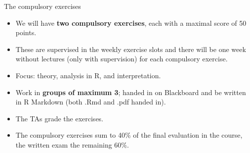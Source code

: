 \documentclass[10pt,ignorenonframetext,]{beamer}
\providecommand{\tightlist}{%
  \setlength{\itemsep}{0pt}\setlength{\parskip}{0pt}}
\begin{document}
\begin{frame}

\begin{block}{The compulsory exercises}

\vspace{2mm}

\begin{itemize}
\tightlist
\item
  We will have \textbf{two compulsory exercises}, each with a maximal
  score of 50 points.
\end{itemize}

\vspace{2mm}

\begin{itemize}
\tightlist
\item
  These are supervised in the weekly exercise slots and there will be
  one week without lectures (only with supervision) for each compulsory
  exercise.
\end{itemize}

\vspace{2mm}

\begin{itemize}
\tightlist
\item
  Focus: theory, analysis in R, and interpretation.
\end{itemize}

\vspace{2mm}

\begin{itemize}
\tightlist
\item
  Work in \textbf{groups of maximum 3}; handed in on Blackboard and be
  written in R Markdown (both .Rmd and .pdf handed in).
\end{itemize}

\vspace{2mm}

\begin{itemize}
\tightlist
\item
  The TAs grade the exercises.
\end{itemize}

\vspace{2mm}

\begin{itemize}
\tightlist
\item
  The compulsory exercises sum to 40\% of the final evaluation in the
  course, the written exam the remaining 60\%.
\end{itemize}

\end{block}

\end{frame}
\end{document}
